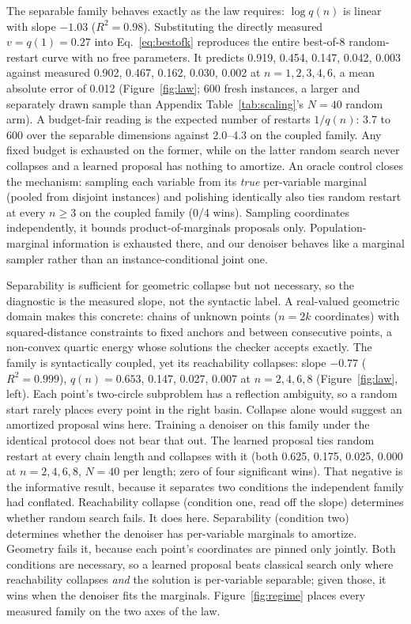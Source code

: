\documentclass[letterpaper]{article} %
\begin{document}
The separable family behaves exactly as the law requires: $\log q(n)$ is linear with slope
$-1.03$ ($R^2 = 0.98$). Substituting the directly measured $v = q(1) = 0.27$ into
Eq.~\eqref{eq:bestofk} reproduces the entire best-of-8 random-restart curve with no free
parameters. It predicts 0.919,
0.454, 0.147, 0.042, 0.003 against measured 0.902, 0.467, 0.162, 0.030, 0.002 at
$n = 1, 2, 3, 4, 6$, a mean absolute error of 0.012
(Figure~\ref{fig:law}; 600 fresh instances, a larger and separately drawn sample than
Appendix Table~\ref{tab:scaling}'s $N = 40$ random arm). A budget-fair
reading is the expected number of restarts $1/q(n)$: 3.7 to 600 over the separable
dimensions against 2.0--4.3 on the coupled family. Any fixed budget is exhausted on the
former, while on the latter random search never collapses and a learned proposal has
nothing to amortize. An oracle control
closes the mechanism: sampling each variable from its \emph{true} per-variable marginal
(pooled from disjoint instances) and polishing identically also ties random restart at every
$n \ge 3$ on the coupled family (0/4 wins). Sampling coordinates independently, it
bounds product-of-marginals proposals only. Population-marginal information is exhausted
there, and our denoiser behaves like a marginal sampler rather than an instance-conditional
joint one.

Separability is sufficient for geometric collapse but not necessary, so the diagnostic is the
measured slope, not the syntactic label. A real-valued geometric domain makes this concrete:
chains of unknown points ($n = 2k$ coordinates) with squared-distance constraints to fixed
anchors and between consecutive points, a non-convex quartic energy whose solutions the
checker accepts exactly. The family is syntactically coupled, yet its reachability collapses:
slope $-0.77$ ($R^2 = 0.999$), $q(n) = 0.653$, 0.147, 0.027, 0.007 at $n = 2, 4, 6, 8$
(Figure~\ref{fig:law}, left). Each point's two-circle subproblem has a reflection
ambiguity, so a random start rarely places every point in the right basin. Collapse alone
would suggest an amortized proposal wins here. Training a denoiser on this family under the
identical protocol does not bear that out. The learned proposal ties random restart at every
chain length and collapses with it (both 0.625, 0.175, 0.025, 0.000 at $n = 2, 4, 6, 8$,
$N = 40$ per length; zero of four significant wins).
That negative is the informative result, because it separates two conditions the independent
family had conflated. Reachability collapse (condition one, read off the slope) determines
whether random search fails. It does here. Separability (condition two) determines whether the
denoiser has per-variable marginals to amortize. Geometry fails it, because each point's
coordinates are pinned only jointly. Both conditions are necessary, so a learned proposal
beats classical search only where reachability collapses \emph{and} the solution is
per-variable separable; given those, it wins when the denoiser fits the marginals.
Figure~\ref{fig:regime} places every measured family on the two axes of the law.
\end{document}
